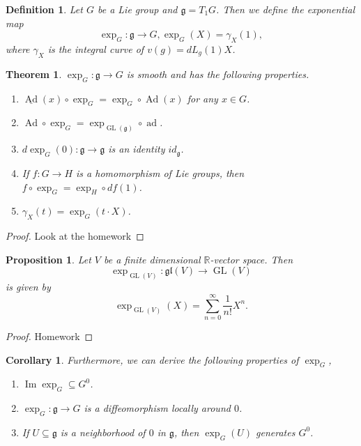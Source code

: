 \documentclass{article}
\newtheorem{theorem}{Theorem}[section]
\newtheorem{proposition}{Proposition}[section]
\newtheorem{definition}{Definition}[section]
\newtheorem{corollary}{Corollary}[section]
\numberwithin{equation}{section}
\DeclareMathOperator{\Image}{Im}
\DeclareMathOperator{\Ad}{Ad}
\DeclareMathOperator{\ad}{ad}
\DeclareMathOperator{\GL}{GL}
\begin{document}
\begin{definition}
Let $G$ be a Lie group and $\mathfrak{g}=T_1G$. Then we define the exponential map
\begin{equation*}
\exp_G:\mathfrak{g}\to G, \exp_G(X) = \gamma_X(1),
\end{equation*}
where $\gamma_X$ is the integral curve of $v(g)=dL_{g}(1)X$.
\end{definition}

\begin{theorem}
$\exp_G:\mathfrak{g}\to G$ is smooth and has the following properties.
\begin{enumerate}[1).]
\item $\underline{\Ad}(x)\circ\exp_G = \exp_G\circ\Ad(x)$ for any $x\in G$.
\item $\Ad\circ\exp_G = \exp_{\GL(\mathfrak{g})}\circ\ad$.
\item $d\exp_G(0):\mathfrak{g}\to\mathfrak{g}$ is an identity $id_{\mathfrak{g}}$.
\item If $f:G\to H$ is a homomorphism of Lie groups, then $f\circ\exp_G=\exp_H\circ df(1)$. 
\item $\gamma_X(t)=\exp_G(t\cdot X)$.
\end{enumerate}
\label{exp_prop}
\end{theorem}

\begin{proof}
Look at the homework %
\end{proof}

\begin{proposition}
\label{exp_series}
Let $V$ be a finite dimensional $\mathbb{R}$-vector space. Then 
\begin{equation*}
\exp_{\GL(V)}:\mathfrak{gl}(V)\to\GL(V)
\end{equation*}
is given by 
\begin{equation*}
\exp_{\GL(V)}(X)=\sum_{n=0}^\infty{\frac 1 {n!}}X^n.
\end{equation*}
\end{proposition}

\begin{proof}
Homework%
\end{proof}

\begin{corollary}
\label{exp_prop_cor}
Furthermore, we can derive the following properties of $\exp_G$,
\begin{enumerate}[1).]
\item $\Image\exp_G\subseteq G^0$.
\item $\exp_G:\mathfrak{g}\to G$ is a diffeomorphism locally around $0$.
\item If $U\subseteq\mathfrak{g}$ is a neighborhood of $0$ in $\mathfrak{g}$, then $\exp_G(U)$ generates $G^0$.
\end{enumerate}
\end{corollary}
\end{document}
